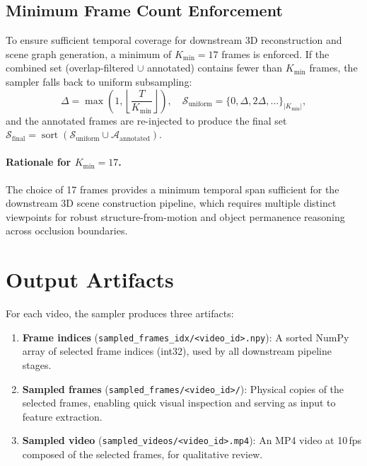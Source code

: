 \documentclass[runningheads]{llncs}
\newcommand{\op}[1]{\operatorname{#1}}
\begin{document}
\subsection{Minimum Frame Count Enforcement}
\label{sec:minimum}

To ensure sufficient temporal coverage for downstream 3D reconstruction and scene graph generation, a minimum of $K_{\min} = 17$ frames is enforced.  If the combined set (overlap-filtered $\cup$ annotated) contains fewer than $K_{\min}$ frames, the sampler falls back to uniform subsampling:
\begin{equation}
    \Delta = \max\!\left(1, \left\lfloor \frac{T}{K_{\min}} \right\rfloor\right), \quad
    \mathcal{S}_{\text{uniform}} = \{0, \Delta, 2\Delta, \ldots\}_{|K_{\min}|},
    \label{eq:uniform_fallback}
\end{equation}
and the annotated frames are re-injected to produce the final set $\mathcal{S}_{\text{final}} = \op{sort}(\mathcal{S}_{\text{uniform}} \cup \mathcal{A}_{\text{annotated}})$.

\paragraph{Rationale for $K_{\min} = 17$.}  The choice of 17 frames provides a minimum temporal span sufficient for the downstream 3D scene construction pipeline, which requires multiple distinct viewpoints for robust structure-from-motion and object permanence reasoning across occlusion boundaries.


\section{Output Artifacts}
\label{sec:outputs}

For each video, the sampler produces three artifacts:
\begin{enumerate}
    \item \textbf{Frame indices} (\texttt{sampled\_frames\_idx/<video\_id>.npy}): A sorted NumPy array of selected frame indices (int32), used by all downstream pipeline stages.
    \item \textbf{Sampled frames} (\texttt{sampled\_frames/<video\_id>/}): Physical copies of the selected frames, enabling quick visual inspection and serving as input to feature extraction.
    \item \textbf{Sampled video} (\texttt{sampled\_videos/<video\_id>.mp4}): An MP4 video at 10\,fps composed of the selected frames, for qualitative review.
\end{enumerate}
\end{document}
